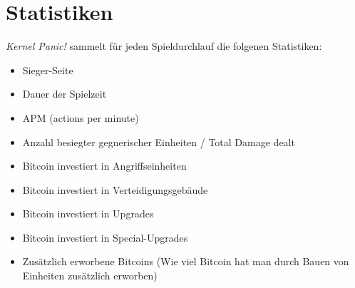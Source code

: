 \section{Statistiken}

%
%

\emph{Kernel Panic!} sammelt für jeden Spieldurchlauf die folgenen Statistiken:

\begin{itemize}[noitemsep, leftmargin=*]
	\item Sieger-Seite
	\item Dauer der Spielzeit
	\item APM (actions per minute)
	\item Anzahl besiegter gegnerischer Einheiten / Total Damage dealt
	\item Bitcoin investiert in Angriffseinheiten
	\item Bitcoin investiert in Verteidigungsgebäude
	\item Bitcoin investiert in Upgrades
	\item Bitcoin investiert in Special-Upgrades
	\item Zusätzlich erworbene Bitcoins (Wie viel Bitcoin hat man durch Bauen von Einheiten zusätzlich erworben)
\end{itemize}

